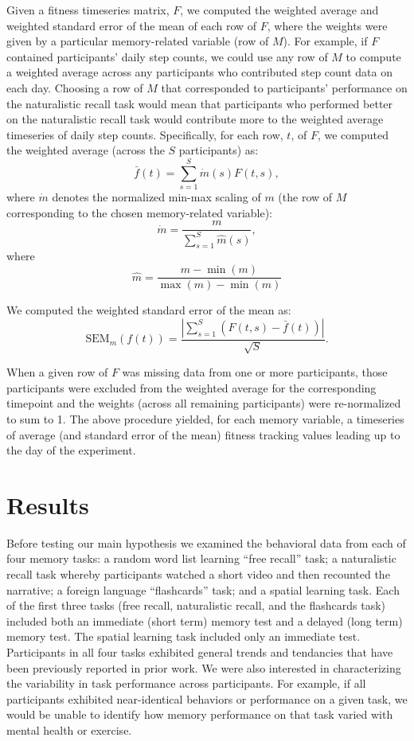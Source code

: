 \documentclass[10pt]{article}
\begin{document}
Given a fitness timeseries matrix, $F$, we computed the weighted
average and weighted standard error of the mean of each row of $F$,
where the weights were given by a particular memory-related variable
(row of $M$).  For example, if $F$ contained participants' daily step
counts, we could use any row of $M$ to compute a weighted average
across any participants who contributed step count data on each day.
Choosing a row of $M$ that corresponded to participants' performance
on the naturalistic recall task would mean that participants who
performed better on the naturalistic recall task would contribute more
to the weighted average timeseries of daily step counts.
Specifically, for each row, $t$, of $F$, we computed the weighted
average (across the $S$ participants) as:
\[
\bar{f}(t) = \sum_{s=1}^S \dot{m}(s) F(t, s),
\]
where $\dot{m}$ denotes the normalized min-max scaling of $m$ (the row
of $M$ corresponding to the chosen memory-related variable):
\[
  \dot{m} = \frac{m}{\sum_{s=1}^S \hat{m}(s)},
\]
where
\[
  \hat{m} = \frac{m - \min(m)}{\max(m) - \min(m)}
\]


We computed the weighted standard error of the mean as:
\[
\mathrm{SEM}_m\left(f(t)\right) = \frac{\left| \sum_{s=1}^S \left( F(t, s) -
    \bar{f}(t)\right) \right|}{\sqrt{S}}.
\]

When a given row of $F$ was missing data from one or more
participants, those participants were excluded from the weighted
average for the corresponding timepoint and the weights (across all
remaining participants) were re-normalized to sum to 1.  The above
procedure yielded, for each memory variable, a timeseries of average
(and standard error of the mean) fitness tracking values leading up to
the day of the experiment.

\section*{Results}
Before testing our main hypothesis we examined the behavioral data
from each of four memory tasks: a random word list learning ``free
recall'' task; a naturalistic recall task whereby participants watched
a short video and then recounted the narrative; a foreign language
``flashcards'' task; and a spatial learning task.  Each of the first
three tasks (free recall, naturalistic recall, and the flashcards
task) included both an immediate (short term) memory test and a
delayed (long term) memory test.  The spatial learning task included
only an immediate test. Participants in all four tasks exhibited
general trends and tendancies that have been previously reported in
prior work.  We were also interested in characterizing the variability
in task performance across participants.  For example, if all
participants exhibited near-identical behaviors or performance on a
given task, we would be unable to identify how memory performance on
that task varied with mental health or exercise.
\end{document}
